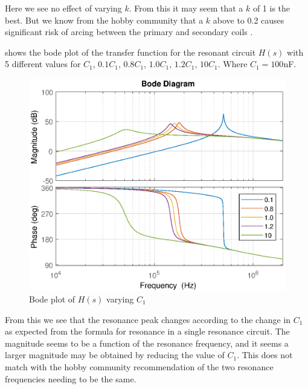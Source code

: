 Here we see no effect of varying $k$. From this it may seem that a $k$ of 1 is the best. But we know from the hobby community that a $k$ above to 0.2 causes significant risk of arcing between the primary and secondary coils \citep{scantesla} \citep{loneoceans} \citep{conner} \citep{easternvoltage} \citep{terrel} \citep{chunkyboy86}.

\newpage
{} shows the bode plot of the transfer function for the resonant circuit $H(s)$ with 5 different values for $C_1$, $0.1C_1$, $0.8C_1$, $1.0C_1$, $1.2C_1$, $10C_1$. Where $C_1 = 100$nF.

\begin{figure}[H]
    \centering
    \includegraphics[width=\textwidth]{img/CoilRigBode_C1.eps}
    \caption{Bode plot of $H(s)$ varying $C_1$}
    \label{fig:bode_c1}
\end{figure}

From this we see that the resonance peak changes according to the change in $C_1$ as expected from the formula for resonance in a single resonance circuit. The magnitude seems to be a function of the resonance frequency, and it seems a larger magnitude may be obtained by reducing the value of $C_1$. This does not match with the hobby community recommendation of the two resonance frequencies needing to be the same.

